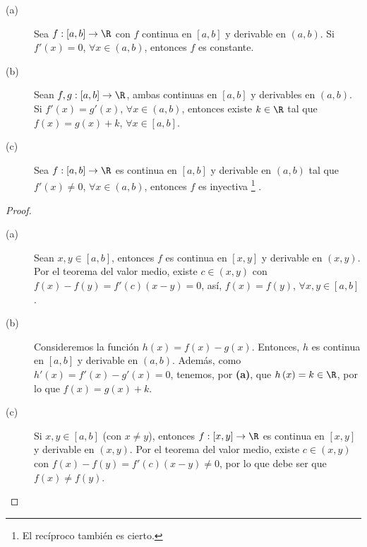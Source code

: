 \begin{fcolorary}[]
	\normalfont 
	\begin{description}
	\item[(a)] Sea $\displaystyle f: [a,b] \to \R $ con $\displaystyle f $ continua en $\displaystyle [a,b] $ y derivable en $\displaystyle \left(a,b\right) $. Si $\displaystyle f'\left(x\right) = 0 $, $\displaystyle \forall x \in \left(a,b\right) $, entonces $\displaystyle f $ es constante.
	\item[(b)] Sean $\displaystyle f,g : [a,b] \to \R $, ambas continuas en $\displaystyle [a,b] $ y derivables en $\displaystyle \left(a,b\right) $. Si $\displaystyle f'\left(x\right) = g'\left(x\right) $, $\displaystyle \forall x \in \left(a,b\right) $, entonces existe $\displaystyle k \in \R $ tal que $\displaystyle f\left(x\right) = g\left(x\right) + k $, $\displaystyle \forall x \in [a,b] $. 
	\item[(c)] Sea $\displaystyle f : [a,b] \to \R$ es continua en $\displaystyle \left[a,b\right]  $ y derivable en $\displaystyle \left(a,b\right) $ tal que $\displaystyle f'\left(x\right) \neq 0 $, $\displaystyle \forall x \in \left(a,b\right) $, entonces $\displaystyle f $ es inyectiva \footnote{El recíproco también es cierto.} .
	\end{description}
\end{fcolorary}
\begin{proof}
\begin{description}
	\item[(a)] Sean $\displaystyle x,y \in [a,b]$, entonces $\displaystyle f $ es continua en $\displaystyle [x,y] $  y derivable en $\displaystyle \left(x,y\right) $. Por el teorema del valor medio, existe $\displaystyle c \in \left(x,y\right) $ con $\displaystyle f\left(x\right)-f\left(y\right) = f'\left(c\right)\left(x-y\right) = 0 $, así, $\displaystyle f\left(x\right) = f\left(y\right) $, $\displaystyle \forall x,y \in \left[a,b\right]  $.
	\item[(b)] Consideremos la función $\displaystyle h\left(x\right) = f\left(x\right)-g\left(x\right) $. Entonces, $\displaystyle h $ es continua en $\displaystyle [a,b] $ y derivable en $\displaystyle \left(a,b\right) $. Además, como $\displaystyle h'\left(x\right) = f'\left(x\right)-g'\left(x\right) = 0 $, tenemos, por \textbf{(a)}, que $\displaystyle h\left(x\right) = k \in \R $, por lo que $\displaystyle f\left(x\right) = g\left(x\right) + k $.
	\item[(c)] Si $\displaystyle x,y \in [a,b] $ (con $\displaystyle x \neq y $), entonces $\displaystyle f : [x,y] \to \R $ es continua en $\displaystyle [x,y] $ y derivable en $\displaystyle \left(x,y\right) $. Por el teorema del valor medio, existe $\displaystyle c \in \left(x,y\right) $ con $\displaystyle f\left(x\right)-f\left(y\right) = f'\left(c\right)\left(x-y\right) \neq 0 $, por lo que debe ser que $\displaystyle f\left(x\right) \neq f\left(y\right) $.
\end{description}
\end{proof}
